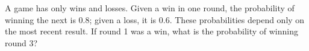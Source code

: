 A game has only wins and losses. Given a win in one round, the probability of winning the next is 0.8; given a loss, it is 0.6. These probabilities depend only on the most recent result. If round 1 was a win, what is the probability of winning round 3?
